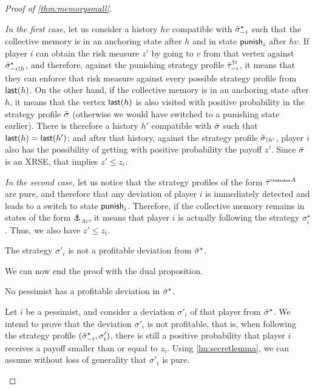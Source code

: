 \begin{proof}[Proof of \cref{thm:memorysmall}]
\begin{claimproof}
    \emph{In the first case,} let us consider a history $hv$ compatible with ${\bar{\sigma}}^\star_{-i}$ such that the collective memory is in an anchoring state after $h$ and in state $\mathsf{punish}_i$ after $hv$.
    If player $i$ can obtain the risk measure $z'$ by going to $v$ from that vertex against ${\bar{\sigma}}^\star_{-i\upharpoonright h}$, and therefore, against the punishing strategy profile ${\bar{\tau}}^{\dag i}_{-i}$, it means that they can enforce that risk measure against every possible strategy profile from $\mathsf{last}(h)$.
    On the other hand, if the collective memory is in an anchoring state after $h$, it means that the vertex $\mathsf{last}(h)$ is also visited with positive probability in the strategy profile ${\bar{\sigma}}$ (otherwise we would have switched to a punishing state earlier).
    There is therefore a history $h'$ compatible with ${\bar{\sigma}}$ such that $\mathsf{last}(h) = \mathsf{last}(h')$; and after that history, against the strategy profile ${\bar{\sigma}}_{\upharpoonright h'}$, player $i$ also has the possibility of getting with positive probability the payoff $z'$.
    Since ${\bar{\sigma}}$ is an XRSE, that implies $z' \leq z_i$.

    \emph{In the second case,} let us notice that the strategy profiles of the form $\btau^{\anch A}$ are pure, and therefore that any deviation of player $i$ is immediately detected and leads to a switch to state $\mathsf{punish}_i$.
    Therefore, if the collective memory remains in states of the form $\anchor_{A v}$, it means that player $i$ is actually following the strategy $\sigma^\star_i$.
    Thus, we also have $z' \leq z_i$.
    
    The strategy $\sigma'_i$ is not a profitable deviation from ${\bar{\sigma}}^\star$.
\end{claimproof}

We can now end the proof with the dual proposition.

\begin{proposition}
    No pessimist has a profitable deviation in ${\bar{\sigma}}^\star$.
\end{proposition}

\begin{claimproof}
    Let $i$ be a pessimist, and consider a deviation $\sigma'_i$ of that player from ${\bar{\sigma}}^\star$.
    We intend to prove that the deviation $\sigma'_i$ is not profitable, that is, when following the strategy profile $({\bar{\sigma}}^\star_{-i}, \sigma'_i)$, there is still a positive probability that player $i$ receives a payoff smaller than or equal to $z_i$.
    Using \cref{lm:secretlemma}, we can assume without loss of generality that $\sigma'_i$ is pure.


\end{claimproof}
\end{proof}
